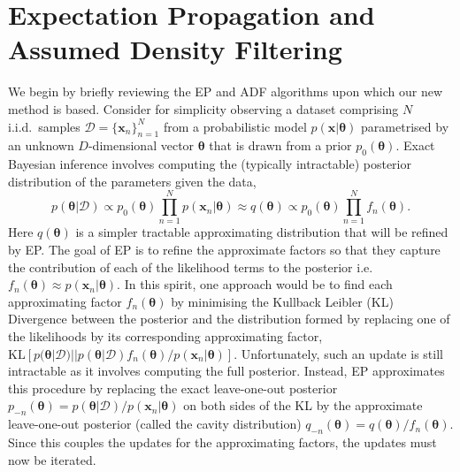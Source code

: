 

\section{Expectation Propagation and Assumed Density Filtering}
We begin by briefly reviewing the EP and ADF algorithms upon which our new method is based. Consider for simplicity observing a dataset comprising $N$ i.i.d.~samples $\mathcal{D} = \{\bm{x}_n \}_{n=1}^N$ from a probabilistic model $p(\bm{x}|\bm{\theta})$ parametrised by an unknown $D$-dimensional vector $\bm{\theta}$ that is drawn from a prior $p_0(\bm{\theta})$. Exact Bayesian inference involves computing the (typically intractable) posterior distribution of the parameters given the data, 
\begin{equation}
p(\bm{\theta} | \mathcal{D}) \propto p_0(\bm{\theta}) \prod_{n=1}^{N} p(\bm{x}_n | \bm{\theta}) \approx q(\bm{\theta}) \propto p_0(\bm{\theta}) \prod_{n=1}^{N} f_n(\bm{\theta}).
\end{equation}
%
Here $q(\bm{\theta})$  is a simpler tractable approximating distribution that will be refined by EP.
%
%
%
The goal of EP is to refine the approximate factors so that they capture the contribution of each of the likelihood terms to the posterior i.e.~$f_n(\bm{\theta}) \approx p(\bm{x}_n | \bm{\theta})$. In this spirit, one approach would be to find each approximating factor $f_n(\bm{\theta})$ by minimising the Kullback Leibler (KL) Divergence between the posterior and the distribution formed by replacing one of the likelihoods by its corresponding approximating factor,  $\mathrm{KL}[p(\bm{\theta}|\mathcal{D}) || p(\bm{\theta}|\mathcal{D}) f_n(\bm{\theta})/ p(\bm{x}_n | \bm{\theta})]$. Unfortunately, such an update is still intractable as it involves computing the full posterior. Instead, EP approximates this procedure by replacing the exact leave-one-out posterior $p_{-n}(\bm{\theta}) = p(\bm{\theta}|\mathcal{D}) / p(\bm{x}_n | \bm{\theta})$ on both sides of the KL by the approximate leave-one-out posterior (called the cavity distribution) $q_{-n}(\bm{\theta}) =q(\bm{\theta})/f_n(\bm{\theta})$. Since this couples the updates for the approximating factors, the updates must now be iterated.

